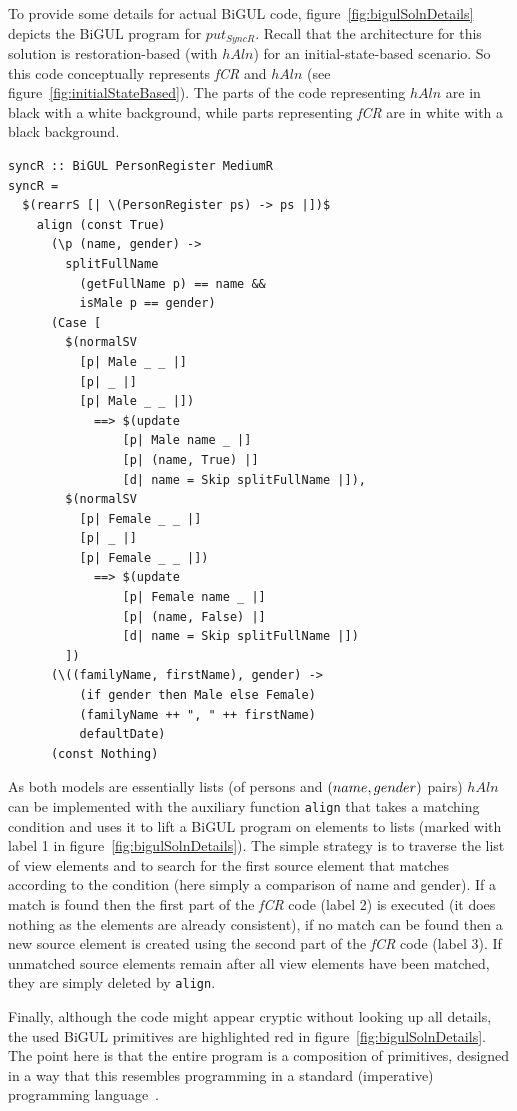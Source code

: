 To provide some details for actual BiGUL code, figure~\ref{fig:bigulSolnDetails} depicts the BiGUL program for $put_{SyncR}$.
Recall that the architecture for this solution is restoration-based (with $\mathit{hAln}$) for an initial-state-based scenario.
So this code conceptually represents \emph{fCR} and $\mathit{hAln}$ (see figure~\ref{fig:initialStateBased}).
The parts of the code representing $\mathit{hAln}$ are in black with a white background, while parts representing \emph{fCR} are in white with a black background.


\begin{lstlisting}[label={lst:bigulSolnDetails}, float=htb!, language=bigul, caption={Structure of a BiGUL program}]
syncR :: BiGUL PersonRegister MediumR
syncR =
  $(rearrS [| \(PersonRegister ps) -> ps |])$
    align (const True)
      (\p (name, gender) -> 
        splitFullName 
          (getFullName p) == name &&
          isMale p == gender)
      (Case [ 
        $(normalSV 
          [p| Male _ _ |] 
          [p| _ |] 
          [p| Male _ _ |])
            ==> $(update 
                [p| Male name _ |] 
                [p| (name, True) |] 
                [d| name = Skip splitFullName |]),
        $(normalSV 
          [p| Female _ _ |] 
          [p| _ |] 
          [p| Female _ _ |])
            ==> $(update 
                [p| Female name _ |] 
                [p| (name, False) |] 
                [d| name = Skip splitFullName |])
        ])
      (\((familyName, firstName), gender) ->
          (if gender then Male else Female) 
          (familyName ++ ", " ++ firstName) 
          defaultDate)
      (const Nothing)
\end{lstlisting}

As both models are essentially lists (of persons and $(name,\- gender)$ pairs) $\mathit{hAln}$ can be implemented with the auxiliary function \texttt{align} that takes a matching condition and uses it to lift a BiGUL program on elements to lists (marked with label 1 in figure~\ref{fig:bigulSolnDetails}).
The simple strategy is to traverse the list of view elements and to search for the first source element that matches according to the condition (here simply a comparison of name and gender).
If a match is found then the first part of the \emph{fCR} code (label 2) is executed (it does nothing as the elements are already consistent), if no match can be found then a new source element is created using the second part of the \emph{fCR} code (label 3).
If unmatched source elements remain after all view elements have been matched, they are simply deleted by \texttt{align}.

Finally, although the code might appear cryptic without looking up all details, the used BiGUL primitives are highlighted red in figure~\ref{fig:bigulSolnDetails}.
The point here is that the entire program is a composition of primitives, designed in a way that this resembles programming in a standard (imperative) programming language~\cite{POPL2018-Ko}.
